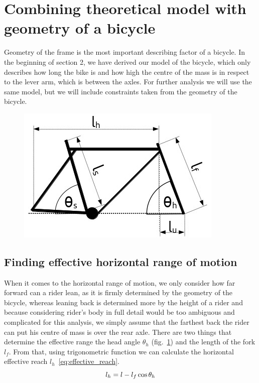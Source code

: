 \documentclass[12pt, a4]{article}
\begin{document}
\section{Combining theoretical model with geometry of a bicycle}\label{geometry}
Geometry of the frame is the most important describing factor of a bicycle. In the beginning of section 2, we
have derived our model of the bicycle, which only describes how long the bike is and how high the centre of the 
mass is in respect to the lever arm, which is between the axles. For further analysis we will use the same model, 
but we will include constraints taken from the geometry of the bicycle. 
\begin{figure}[H]
\caption{}
\centering%
\label{fig:bike_geometry}
\includegraphics[width=0.5\linewidth]{bike_geometry}%
\end{figure}
\subsection{Finding effective horizontal range of motion}\label{geometry_horizontal_reach}
When it comes to the horizontal range of motion, we only consider how far forward can a rider lean, as it is firmly
determined by the geometry of the bicycle, whereas leaning back is determined more by the height of a rider and because considering 
rider's body in full detail would be too ambiguous and complicated for this analysis, we simply assume that the farthest back the rider can put his centre of mass is over the rear axle.
There are two things that determine the effective range \- the head angle $\theta_h$ (fig.~\ref{fig:bike_geometry}) and the length of the fork $l_f$.
From that, using trigonometric function we can calculate the horizontal effective reach $l_h$~\eqref{eq:effective_reach}.
\begin{equation}
\centering%
\label{eq:effective_reach}
l_h = l - l_f\cos\theta_h
\end{equation}
\end{document}
